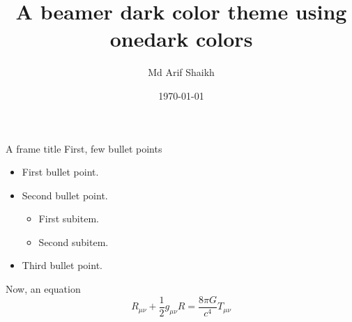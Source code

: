 \documentclass{beamer}
\title{A beamer dark color theme using onedark colors}
\author{Md Arif Shaikh}
\institute{{\color{onecyan}International Centre for Theoretical Sciences, Bangalore, India}}
\date{\today}
\begin{document}
\thispagestyle{empty}
\maketitle

\begin{frame}
  {A frame title}
  First, few bullet points
  \begin{itemize}
  \item First bullet point.
  \item Second bullet point.
    \begin{itemize}
    \item First subitem.
    \item Second subitem.
    \end{itemize}
  \item Third bullet point.
  \end{itemize}
  Now, an equation
  \begin{equation}
    \label{eq:equation}
    R_{\mu\nu} + \frac{1}{2} g_{\mu\nu} R = \frac{8\pi G}{c^4} T_{\mu \nu}
  \end{equation}
\end{frame}
\end{document}
